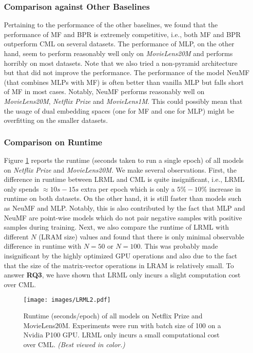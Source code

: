 \documentclass[sigconf]{acmart}
\begin{document}
\subsubsection{Comparison against Other Baselines}
Pertaining to the performance of the other baselines, we found that the performance of MF and BPR is extremely competitive, i.e., both MF and BPR outperform CML on several datasets. The performance of MLP, on the other hand, seem to perform reasonably well only on \textit{MovieLens20M} and performs horribly on most datasets. Note that we also tried a non-pyramid architecture but that did not improve the performance.  The performance of the model NeuMF (that combines MLPs with MF) is often better than vanilla MLP but falls short of MF in most cases. Notably, NeuMF performs reasonably well on \textit{MovieLens20M}, \textit{Netflix Prize} and \textit{MovieLens1M}. This could possibly mean that the usage of dual embedding spaces (one for MF and one for MLP) might be overfitting on the smaller datasets. 

\subsubsection{Comparison on Runtime}
Figure \ref{fig:runtime} reports the runtime (seconds taken to run a single epoch) of all models on \textit{Netflix Prize} and \textit{MovieLens20M}. We make several observations. First, the difference in runtime between \textsc{LRML} and CML is quite insignificant, i.e., \textsc{LRML} only spends $\approx 10s-15s$ extra per epoch which is only a $5\%-10\%$ increase in runtime on both datasets. On the other hand, it is still faster than models such as NeuMF and MLP. Notably, this is also contributed by the fact that MLP and NeuMF are point-wise models which do not pair negative samples with positive samples during training. Next, we also compare the runtime of \textsc{LRML} with different $N$ (LRAM size) values and found that there is only minimal observable difference in runtime with $N=50$ or $N=100$. This was probably made insignificant by the highly optimized GPU operations and also due to the fact that the size of the matrix-vector operations in LRAM is relatively small. To answer \textbf{RQ3}, we have shown that \textsc{LRML} only incurs a slight computation cost over CML. 

\begin{figure}[ht]
\begin{center}
\texttt{[image: images/LRML2.pdf]}
\caption{Runtime (seconds/epoch) of all models on Netflix Prize and MovieLens20M. Experiments were run with batch size of 100 on a Nvidia P100 GPU. LRML only incurs a small computational cost over CML. \textit{(Best viewed in color.)}}
\label{fig:runtime}
\end{center}
\end{figure}
\end{document}
